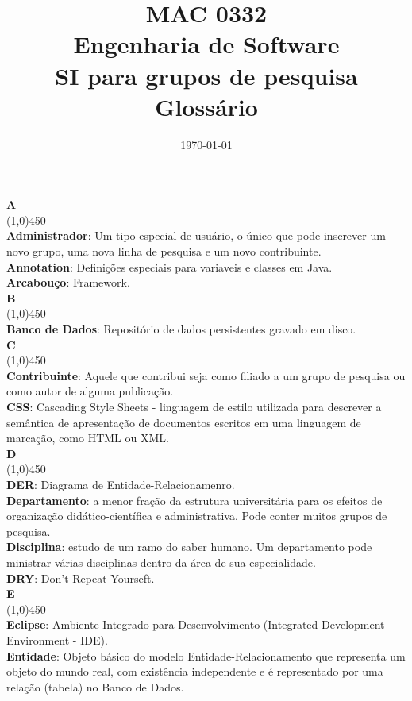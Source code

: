 \documentclass[11pt, a4paper]{article}
\title{MAC 0332\\
	Engenharia de Software\\
	SI para grupos de pesquisa\\
	Glossário}
\date{\today}
\begin{document}
	\maketitle
	\newpage

	\noindent\textbf{\huge{A}}\\
	\line(1,0){450}\\
	\textbf{Administrador}: Um tipo especial de usuário, o único 
	que pode inscrever um novo grupo, uma nova linha de pesquisa
	e um novo contribuinte.\\
	\textbf{Annotation}: Definições especiais para variaveis e 
	classes em Java.\\
	\textbf{Arcabouço}: Framework.\\
	
	\noindent\textbf{\huge{B}}\\
	\line(1,0){450}\\
	\textbf{Banco de Dados}: Repositório de dados persistentes gravado em disco.\\

	\noindent\textbf{\huge{C}}\\
	\line(1,0){450}\\
	\textbf{Contribuinte}: Aquele que contribui seja como filiado a um grupo de pesquisa ou como
	autor de alguma publicação.\\
	\textbf{CSS}: Cascading Style Sheets - linguagem de estilo utilizada para descrever a semântica de apresentação de documentos escritos em uma linguagem de marcação, como HTML ou XML.\\

	\noindent\textbf{\huge{D}}\\
	\line(1,0){450}\\
	\textbf{DER}: Diagrama de Entidade-Relacionamenro.\\
	\textbf{Departamento}: a menor fração da estrutura universitária para os efeitos de organização didático-científica e administrativa. Pode conter muitos grupos de pesquisa.\\
	\textbf{Disciplina}: estudo de um ramo do saber humano. Um departamento pode ministrar várias disciplinas dentro da área de sua especialidade.\\
	\textbf{DRY}: Don't Repeat Yourseft.\\
	
	\noindent\textbf{\huge{E}}\\
	\line(1,0){450}\\
	\textbf{Eclipse}: Ambiente Integrado para Desenvolvimento (Integrated Development Environment - IDE).\\
	\textbf{Entidade}: Objeto básico do modelo Entidade-Relacionamento que representa um objeto do mundo real, com existência independente e é representado por uma relação (tabela) no Banco de Dados.\\
	
\end{document}
